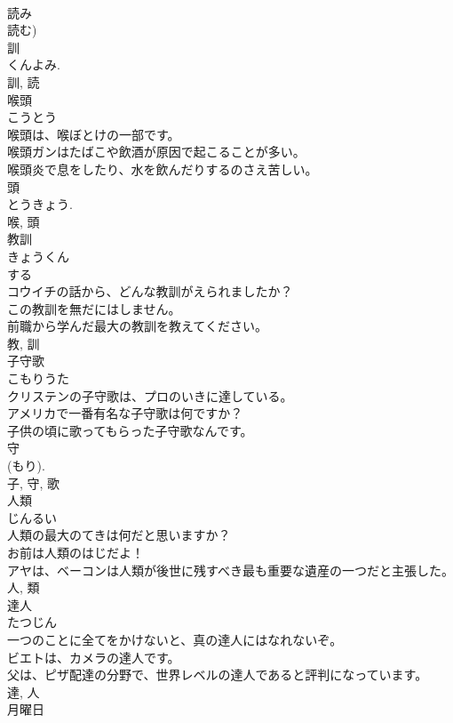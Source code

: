 \documentclass[8pt]{extreport}
\begin{document}
\begin{CJK}{UTF8}{min}
\\	読み 
\\	読む) 
\\	訓 
\\	くんよみ. 
\\	訓, 読	
\\	喉頭	
\\	こうとう	
\\	喉頭は、喉ぼとけの一部です。	
\\	喉頭ガンはたばこや飲酒が原因で起こることが多い。	
\\	喉頭炎で息をしたり、水を飲んだりするのさえ苦しい。	
\\	頭 
\\	とうきょう. 
\\	喉, 頭	
\\	教訓	
\\	きょうくん	
\\	する 
\\	コウイチの話から、どんな教訓がえられましたか？	
\\	この教訓を無だにはしません。	
\\	前職から学んだ最大の教訓を教えてください。	
\\	教, 訓	
\\	子守歌	
\\	こもりうた	
\\	クリステンの子守歌は、プロのいきに達している。	
\\	アメリカで一番有名な子守歌は何ですか？	
\\	子供の頃に歌ってもらった子守歌なんです。	
\\	守 
\\	(もり). 
\\	子, 守, 歌	
\\	人類	
\\	じんるい	
\\	人類の最大のてきは何だと思いますか？	
\\	お前は人類のはじだよ！	
\\	アヤは、ベーコンは人類が後世に残すべき最も重要な遺産の一つだと主張した。	
\\	人, 類	
\\	達人	
\\	たつじん	
\\	一つのことに全てをかけないと、真の達人にはなれないぞ。	
\\	ビエトは、カメラの達人です。	
\\	父は、ピザ配達の分野で、世界レベルの達人であると評判になっています。	
\\	達, 人	
\\	月曜日	

\end{CJK}
\end{document}
